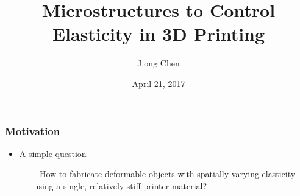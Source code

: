\documentclass[serif,mathserif]{beamer}
\author[Jiong Chen]{Jiong Chen}
\title[\hspace{2em}\insertframenumber/\inserttotalframenumber]{Microstructures to Control Elasticity in 3D Printing}
\date{April 21, 2017}
\begin{document}
\maketitle

\begin{frame}
  \frametitle{Motivation}
  \begin{itemize}
  \item A simple question
    \begin{itemize}
    \item[-] How to fabricate deformable objects with spatially varying elasticity using a single, relatively
      stiff printer material?
    \end{itemize}
  \end{itemize}
\end{frame}
\end{document}
